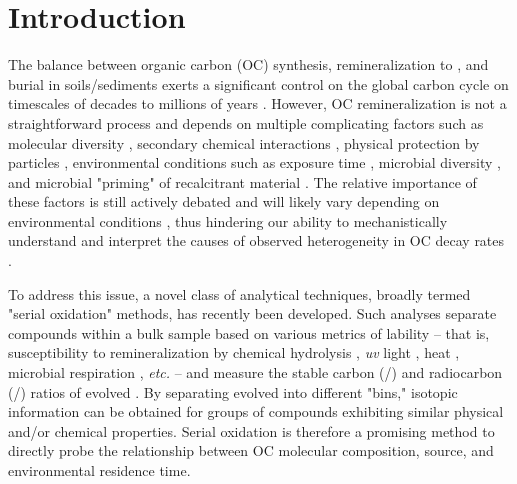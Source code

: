 \section{Introduction}

The balance between organic carbon (OC) synthesis, remineralization to , and burial in soils/sediments exerts a significant control on the global carbon cycle on timescales of decades to millions of years \citep[\textit{e.g.}][]{Lasaga:1985ts,Derry:1996um,Hayes:2006ca,Galy:2008ff}. However, OC remineralization is not a straightforward process and depends on multiple complicating factors such as molecular diversity \citep{Kellerman:2015jn}, secondary chemical interactions \citep{Hedges:2000vh,Schmidt:2011gg}, physical protection by particles \citep{Mayer:1994wn,Mikutta:2006gx}, environmental conditions such as  exposure time \citep{Hartnett:1998id}, microbial diversity \citep{Kramer:2008dd,Janssens:2010hd,Schmidt:2011gg}, and microbial "priming" of recalcitrant material \citep{Bianchi:2011cu}. The relative importance of these factors is still actively debated and will likely vary depending on environmental conditions \citep[\textit{e.g.}][]{Hedges:2001ve,Rothman:2007jq,Schmidt:2011gg,Kellerman:2015jn}, thus hindering our ability to mechanistically understand and interpret the causes of observed heterogeneity in OC decay rates \citep{Boudreau:1991wf}.

To address this issue, a novel class of analytical techniques, broadly termed "serial oxidation" methods, has recently been developed. Such analyses separate compounds within a bulk sample based on various metrics of lability -- that is, susceptibility to remineralization by chemical hydrolysis \citep{Helfrich:2007ej}, \textit{uv} light \citep{Follett:2014if}, heat \citep{Szidat:2004kx,Currie:2005wo,Rosenheim:2008ed}, microbial respiration \citep{Beaupre:2016km}, \textit{etc.} -- and measure the stable carbon (/) and radiocarbon (/) ratios of evolved . By separating evolved  into different "bins," isotopic information can be obtained for groups of compounds exhibiting similar physical and/or chemical properties. Serial oxidation is therefore a promising method to directly probe the relationship between OC molecular composition, source, and environmental residence time.


